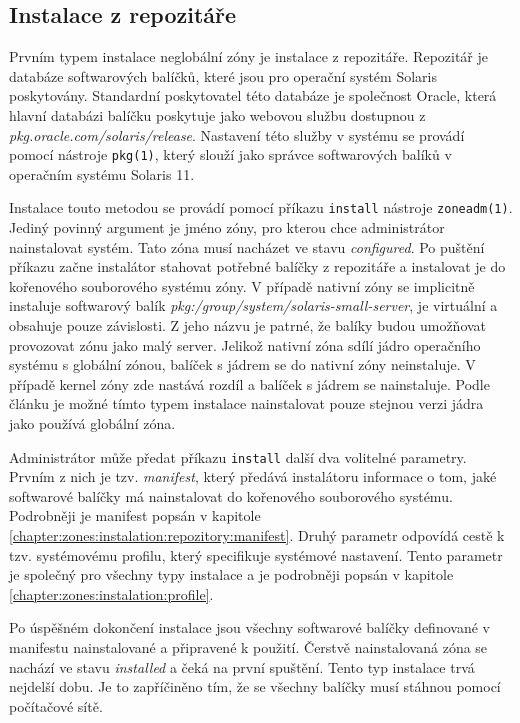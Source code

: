 \subsection{Instalace z repozitáře}
\label{chapter:zones:instalation:repozitory}
Prvním typem instalace neglobální zóny je instalace z repozitáře. Repozitář je databáze softwarových balíčků, které jsou pro 
operační systém Solaris poskytovány. Standardní poskytovatel této databáze je společnost Oracle, která hlavní databázi balíčku
poskytuje jako webovou službu dostupnou z \textit{pkg.oracle.com/solaris/release}. Nastavení této služby v systému se provádí
pomocí nástroje \verb|pkg(1)|, který slouží jako správce softwarových balíků v operačním systému Solaris 11.

Instalace touto metodou se provádí pomocí příkazu \verb|install| nástroje \verb|zoneadm(1)|. Jediný povinný argument je jméno
zóny, pro kterou chce administrátor nainstalovat systém. Tato zóna musí nacházet ve stavu \textit{configured}. Po puštění 
příkazu začne instalátor stahovat potřebné balíčky z repozitáře a instalovat je do kořenového souborového systému zóny. V případě
nativní zóny se implicitně instaluje softwarový balík \textit{pkg:/group/system/solaris-small-server}, je virtuální
a obsahuje pouze závislosti. Z jeho názvu je patrné, že balíky budou umožňovat provozovat zónu jako malý server. Jelikož nativní
zóna sdílí jádro operačního systému s globální zónou, balíček s jádrem se do nativní zóny neinstaluje. V případě kernel zóny
zde nastává rozdíl a balíček s jádrem se nainstaluje. Podle článku \cite{oracle:solaris:zones:kernel_version} je možné tímto
typem instalace nainstalovat pouze stejnou verzi jádra jako používá globální zóna.

Administrátor může předat příkazu \verb|install| další dva volitelné parametry. Prvním z nich je tzv. \textit{manifest}, který
předává instalátoru informace o tom, jaké softwarové balíčky má nainstalovat do kořenového souborového systému. Podrobněji 
je manifest popsán v kapitole \ref{chapter:zones:instalation:repozitory:manifest}. Druhý parametr odpovídá cestě k tzv. 
systémovému profilu, který specifikuje systémové nastavení. Tento parametr je společný pro všechny typy instalace a je podrobněji
popsán v kapitole \ref{chapter:zones:instalation:profile}.

Po úspěšném dokončení instalace jsou všechny softwarové balíčky definované v manifestu nainstalované a připravené k použití.
Čerstvě nainstalovaná zóna se nachází ve stavu \textit{installed} a čeká na první spuštění. Tento typ instalace trvá nejdelší
dobu. Je to zapříčiněno tím, že se všechny balíčky musí stáhnou pomocí počítačové sítě.
